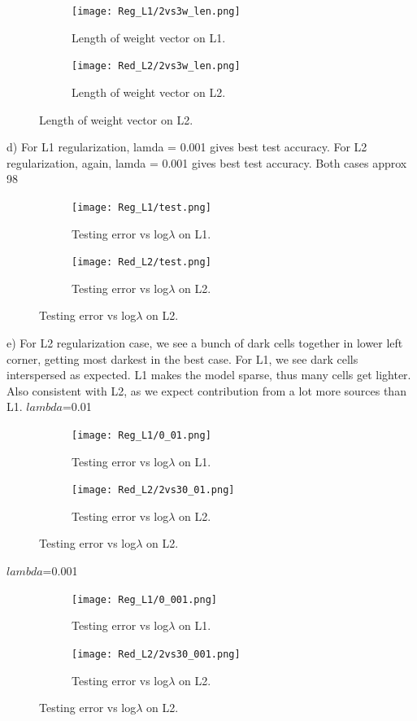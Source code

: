 \documentclass{article} %
\begin{document}
\begin{figure}[H]
\centering
\begin{subfigure}{.5\textwidth}
	\centering
	\texttt{[image: Reg\_L1/2vs3w\_len.png]}
    \caption{Length of weight vector on L1.}
\end{subfigure}%
\begin{subfigure}{.5\textwidth}
    \centering
    \texttt{[image: Red\_L2/2vs3w\_len.png]}
    \caption{Length of weight vector on L2.}
\end{subfigure}
\end{figure}

 d) For L1 regularization, lamda = 0.001 gives best test accuracy. For L2 regularization, again, lamda = 0.001 gives best test accuracy. Both cases approx 98%
     
\begin{figure}[H]
\centering
\begin{subfigure}{.5\textwidth}
	\centering
	\texttt{[image: Reg\_L1/test.png]}
	\caption{Testing error vs log$\lambda$ on L1.}
\end{subfigure}%
\begin{subfigure}{.5\textwidth}
    \centering
	\texttt{[image: Red\_L2/test.png]}
	\caption{Testing error vs log$\lambda$ on L2.}
\end{subfigure}
\end{figure}

 e) 	For L2 regularization case, we see a bunch of dark cells together in lower left corner, getting most darkest in the best case. For L1, we see dark cells interspersed as expected. L1 makes the model sparse, thus many cells get lighter. Also consistent with L2, as we expect contribution from a lot more sources than L1.
$lambda$=0.01

\begin{figure}[H]
\centering
\begin{subfigure}{.5\textwidth}
	\centering
	\texttt{[image: Reg\_L1/0\_01.png]}
	\caption{Testing error vs log$\lambda$ on L1.}
\end{subfigure}%
\begin{subfigure}{.5\textwidth}
 	\centering
	\texttt{[image: Red\_L2/2vs30\_01.png]}
	\caption{Testing error vs log$\lambda$ on L2.}
\end{subfigure}
\end{figure}

$lambda$=0.001

\begin{figure}[H]
\centering
\begin{subfigure}{.5\textwidth}
	\centering
	\texttt{[image: Reg\_L1/0\_001.png]}
	\caption{Testing error vs log$\lambda$ on L1.}
\end{subfigure}%
\begin{subfigure}{.5\textwidth}
	\centering
	\texttt{[image: Red\_L2/2vs30\_001.png]}
	\caption{Testing error vs log$\lambda$ on L2.}
\end{subfigure}
\end{figure}
\end{document}
